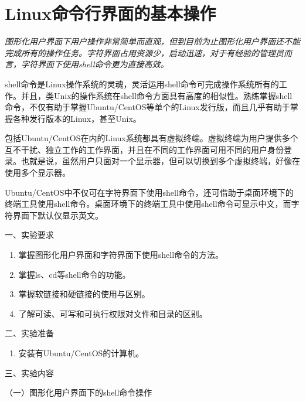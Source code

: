 \chapter{Linux命令行界面的基本操作}

{\itshape
图形化用户界面下用户操作非常简单而直观，但到目前为止图形化用户界面还不能完成所有的操作任务。字符界面占用资源少，启动迅速，对于有经验的管理员而言，字符界面下使用shell命令更为直接高效。

shell命令是Linux操作系统的灵魂，灵活运用shell命令可完成操作系统所有的工作。并且，类Unix的操作系统在shell命令方面具有高度的相似性。熟练掌握shell命令，不仅有助于掌握Ubuntu/CentOS等单个的Linux发行版，而且几乎有助于掌握各种发行版本的Linux，甚至Unix。

包括Ubuntu/CentOS在内的Linux系统都具有虚拟终端。虚拟终端为用户提供多个互不干扰、独立工作的工作界面，并且在不同的工作界面可用不同的用户身份登录。也就是说，虽然用户只面对一个显示器，但可以切换到多个虚拟终端，好像在使用多个显示器。

Ubuntu/CentOS中不仅可在字符界面下使用shell命令，还可借助于桌面环境下的终端工具使用shell命令。桌面环境下的终端工具中使用shell命令可显示中文，而字符界面下默认仅显示英文。
}

\vspace{0.2in}
\noindent
一、实验要求
\begin{enumerate}
  \item 掌握图形化用户界面和字符界面下使用shell命令的方法。
  \item 掌握ls、cd等shell命令的功能。
  \item 掌握软链接和硬链接的使用与区别。
  \item 了解可读、可写和可执行权限对文件和目录的区别。
\end{enumerate}

\vspace{0.2in}
\noindent
二、实验准备
\begin{enumerate}
  \item 安装有Ubuntu/CentOS的计算机。
\end{enumerate}

\vspace{0.2in}
\noindent
三、实验内容

\vspace{0.1in}
（一）图形化用户界面下的shell命令操作

